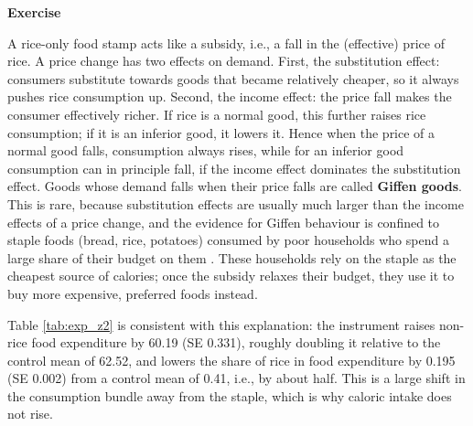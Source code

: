 \documentclass[10pt]{article}
\newcounter{exercise}
\newenvironment{exercise}%
{%
	\refstepcounter{exercise}%
	\textbf{Exercise \theexercise}%
	}%
{
 \par\vspace{\baselineskip}%
\noindent\ignorespacesafterend
}
\begin{document}
\begin{exercise}
\begin{enumerate}
		\color{red}
		A rice-only food stamp acts like a subsidy, i.e., a fall in the (effective) price of rice. A price change has two effects on demand. First, the substitution effect: consumers substitute towards goods that became relatively cheaper, so it always pushes rice consumption up. Second, the income effect: the price fall makes the consumer effectively richer. If rice is a normal good, this further raises rice consumption; if it is an inferior good, it lowers it. Hence when the price of a normal good falls, consumption always rises, while for an inferior good consumption can in principle fall, if the income effect dominates the substitution effect. Goods whose demand falls when their price falls are called \textbf{Giffen goods}. This is rare, because substitution effects are usually much larger than the income effects of a price change, and the evidence for Giffen behaviour is confined to staple foods (bread, rice, potatoes) consumed by poor households who spend a large share of their budget on them \citep{jensen2008}. These households rely on the staple as the cheapest source of calories; once the subsidy relaxes their budget, they use it to buy more expensive, preferred foods instead.

		Table \ref{tab:exp_z2} is consistent with this explanation: the instrument raises non-rice food expenditure by 60.19 (SE 0.331), roughly doubling it relative to the control mean of 62.52, and lowers the share of rice in food expenditure by 0.195 (SE 0.002) from a control mean of 0.41, i.e., by about half. This is a large shift in the consumption bundle away from the staple, which is why caloric intake does not rise.

		
		\color{black}
	\end{enumerate}
\end{exercise}

\end{document}
